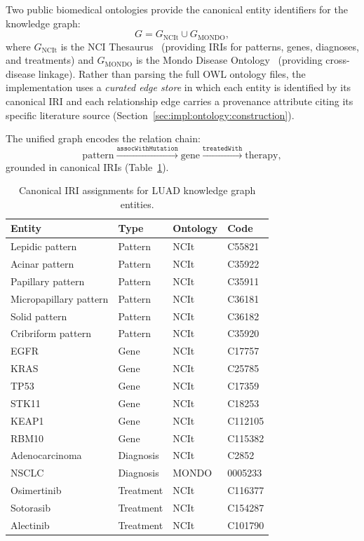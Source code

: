 Two public biomedical ontologies provide the canonical entity
identifiers for the knowledge graph:
\begin{equation}
\label{eq:kg_union}
G = G_{\text{NCIt}} \cup G_{\text{MONDO}},
\end{equation}
where $G_{\text{NCIt}}$ is the NCI Thesaurus~\cite{sioutos2007ncit}
(providing IRIs for patterns, genes, diagnoses, and treatments) and
$G_{\text{MONDO}}$ is the Mondo Disease
Ontology~\cite{mondo_shefchek2020} (providing cross-disease linkage).
Rather than parsing the full OWL ontology files, the implementation
uses a \emph{curated edge store} in which each entity is identified
by its canonical IRI and each relationship edge carries a provenance
attribute citing its specific literature source
(Section~\ref{sec:impl:ontology:construction}).
 
The unified graph encodes the relation chain:
\begin{equation}
\label{eq:kg_chain}
\text{pattern} \xrightarrow{\texttt{assocWithMutation}}
\text{gene} \xrightarrow{\texttt{treatedWith}}
\text{therapy},
\end{equation}
grounded in canonical IRIs (Table~\ref{tab:iri_mapping}).
 
\begin{table}[ht!]
\centering
\small
\caption{Canonical IRI assignments for LUAD knowledge graph entities.}
\label{tab:iri_mapping}
\begin{tabular}{l l l l}
\hline
\textbf{Entity} & \textbf{Type} & \textbf{Ontology} & \textbf{Code} \\
\hline
Lepidic pattern       & Pattern   & NCIt  & C55821  \\
Acinar pattern        & Pattern   & NCIt  & C35922  \\
Papillary pattern     & Pattern   & NCIt  & C35911  \\
Micropapillary pattern & Pattern  & NCIt  & C36181  \\
Solid pattern         & Pattern   & NCIt  & C36182  \\
Cribriform pattern    & Pattern   & NCIt  & C35920  \\
\hline
EGFR  & Gene & NCIt & C17757  \\
KRAS  & Gene & NCIt & C25785  \\
TP53  & Gene & NCIt & C17359  \\
STK11 & Gene & NCIt & C18253  \\
KEAP1 & Gene & NCIt & C112105 \\
RBM10 & Gene & NCIt & C115382 \\
\hline
Adenocarcinoma & Diagnosis & NCIt  & C2852    \\
NSCLC          & Diagnosis & MONDO & 0005233  \\
\hline
Osimertinib  & Treatment & NCIt & C116377 \\
Sotorasib    & Treatment & NCIt & C154287 \\
Alectinib    & Treatment & NCIt & C101790 \\
\hline
\end{tabular}
\end{table}
 
